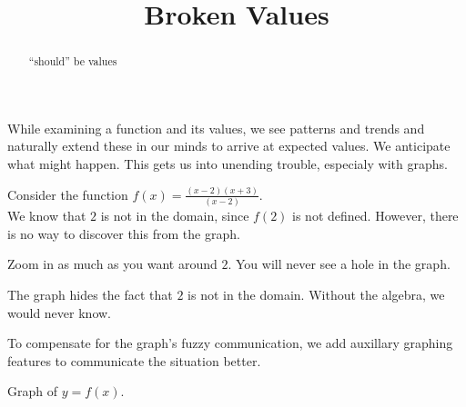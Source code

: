 \documentclass{ximera}
\title{Broken Values}
\begin{document}
\begin{abstract}
``should'' be values
\end{abstract}
\maketitle






While examining a function and its values, we see patterns and trends and naturally extend these in our minds to arrive at expected values. We anticipate what might happen.  This gets us into unending trouble, especialy with graphs.




Consider the function $f(x) = \frac{(x-2)(x+3)}{(x-2)}$. \\

We know that $2$ is not in the domain, since $f(2)$ is not defined.  However, there is no way to discover this from the graph.


Zoom in as much as you want around $2$. You will never see a hole in the graph.  

\begin{center}
\end{center}

The graph hides the fact that $2$ is not in the domain.  Without the algebra, we would never know.

To compensate for the graph's fuzzy communication, we add auxillary graphing features to communicate the situation better.



Graph of $y = f(x)$.

\begin{image}
\end{image}
\end{document}
